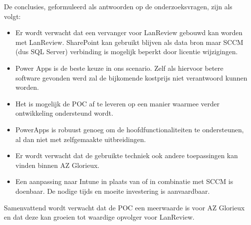 De conclusies, geformuleerd als antwoorden op de onderzoeksvragen, zijn als volgt:
\begin{itemize}
    \item Er wordt verwacht dat een vervanger voor LanReview gebouwd kan worden met LanReview. SharePoint kan gebruikt blijven als data bron maar SCCM (dus SQL Server) verbinding is mogelijk beperkt door licentie wijzigingen. \parencite{Microsoft2020}
    \item Power Apps is de beste keuze in ons scenario. Zelf als hiervoor betere software gevonden werd zal de bijkomende kostprijs niet verantwoord kunnen worden.
    \item Het is mogelijk de POC af te leveren op een manier waarmee verder ontwikkeling ondersteund wordt.
    \item PowerApps is robuust genoeg om de hoofdfunctionaliteiten te ondersteunen, al dan niet met zelfgemaakte uitbreidingen.
    \item Er wordt verwacht dat de gebruikte techniek ook andere toepassingen kan vinden binnen AZ Glorieux.
    \item Een aanpassing naar Intune in plaats van of in combinatie met SCCM is doenbaar. De nodige tijds en moeite investering is aanvaardbaar.
\end{itemize}

\vspace{5mm}

Samenvattend wordt verwacht dat de POC een meerwaarde is voor AZ Glorieux en dat deze kan groeien tot waardige opvolger voor LanReview. 

